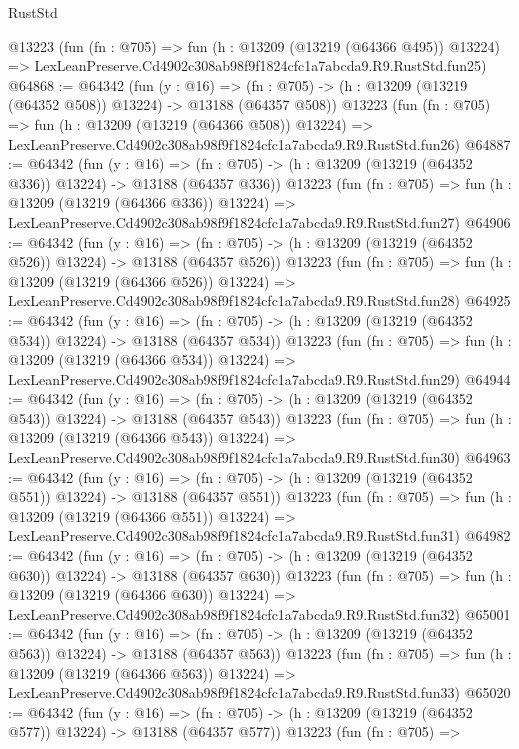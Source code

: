 \begin{lexlean}{RustStd}
\begin{coremodule}
    @13223
    (fun (fn : @705) =>
    fun (h : @13209 (@13219 (@64366 @495)) @13224) =>
    LexLeanPreserve.Cd4902c308ab98f9f1824cfc1a7abcda9.R9.RustStd.fun25)
@64868 := @64342
    (fun (y : @16) =>
    (fn : @705) -> (h : @13209 (@13219 (@64352 @508)) @13224) -> @13188 (@64357 @508))
    @13223
    (fun (fn : @705) =>
    fun (h : @13209 (@13219 (@64366 @508)) @13224) =>
    LexLeanPreserve.Cd4902c308ab98f9f1824cfc1a7abcda9.R9.RustStd.fun26)
@64887 := @64342
    (fun (y : @16) =>
    (fn : @705) -> (h : @13209 (@13219 (@64352 @336)) @13224) -> @13188 (@64357 @336))
    @13223
    (fun (fn : @705) =>
    fun (h : @13209 (@13219 (@64366 @336)) @13224) =>
    LexLeanPreserve.Cd4902c308ab98f9f1824cfc1a7abcda9.R9.RustStd.fun27)
@64906 := @64342
    (fun (y : @16) =>
    (fn : @705) -> (h : @13209 (@13219 (@64352 @526)) @13224) -> @13188 (@64357 @526))
    @13223
    (fun (fn : @705) =>
    fun (h : @13209 (@13219 (@64366 @526)) @13224) =>
    LexLeanPreserve.Cd4902c308ab98f9f1824cfc1a7abcda9.R9.RustStd.fun28)
@64925 := @64342
    (fun (y : @16) =>
    (fn : @705) -> (h : @13209 (@13219 (@64352 @534)) @13224) -> @13188 (@64357 @534))
    @13223
    (fun (fn : @705) =>
    fun (h : @13209 (@13219 (@64366 @534)) @13224) =>
    LexLeanPreserve.Cd4902c308ab98f9f1824cfc1a7abcda9.R9.RustStd.fun29)
@64944 := @64342
    (fun (y : @16) =>
    (fn : @705) -> (h : @13209 (@13219 (@64352 @543)) @13224) -> @13188 (@64357 @543))
    @13223
    (fun (fn : @705) =>
    fun (h : @13209 (@13219 (@64366 @543)) @13224) =>
    LexLeanPreserve.Cd4902c308ab98f9f1824cfc1a7abcda9.R9.RustStd.fun30)
@64963 := @64342
    (fun (y : @16) =>
    (fn : @705) -> (h : @13209 (@13219 (@64352 @551)) @13224) -> @13188 (@64357 @551))
    @13223
    (fun (fn : @705) =>
    fun (h : @13209 (@13219 (@64366 @551)) @13224) =>
    LexLeanPreserve.Cd4902c308ab98f9f1824cfc1a7abcda9.R9.RustStd.fun31)
@64982 := @64342
    (fun (y : @16) =>
    (fn : @705) -> (h : @13209 (@13219 (@64352 @630)) @13224) -> @13188 (@64357 @630))
    @13223
    (fun (fn : @705) =>
    fun (h : @13209 (@13219 (@64366 @630)) @13224) =>
    LexLeanPreserve.Cd4902c308ab98f9f1824cfc1a7abcda9.R9.RustStd.fun32)
@65001 := @64342
    (fun (y : @16) =>
    (fn : @705) -> (h : @13209 (@13219 (@64352 @563)) @13224) -> @13188 (@64357 @563))
    @13223
    (fun (fn : @705) =>
    fun (h : @13209 (@13219 (@64366 @563)) @13224) =>
    LexLeanPreserve.Cd4902c308ab98f9f1824cfc1a7abcda9.R9.RustStd.fun33)
@65020 := @64342
    (fun (y : @16) =>
    (fn : @705) -> (h : @13209 (@13219 (@64352 @577)) @13224) -> @13188 (@64357 @577))
    @13223
    (fun (fn : @705) =>

\end{coremodule}
\end{lexlean}

